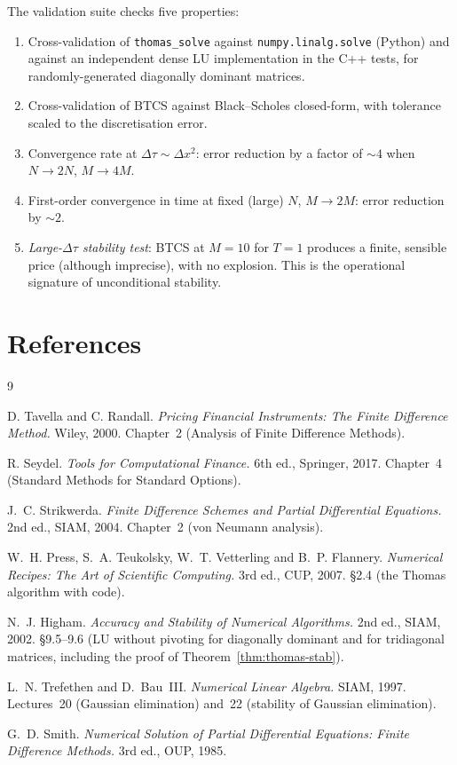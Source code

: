 \documentclass[11pt,a4paper]{article}
\begin{document}
The validation suite checks five properties:
\begin{enumerate}[leftmargin=2em]
\item Cross-validation of \texttt{thomas\_solve} against
\texttt{numpy.linalg.solve} (Python) and against an independent dense
LU implementation in the C++ tests, for randomly-generated diagonally
dominant matrices.
\item Cross-validation of BTCS against Black--Scholes closed-form,
with tolerance scaled to the discretisation error.
\item Convergence rate at $\Delta\tau \sim \Delta x^2$: error reduction
by a factor of $\sim 4$ when $N \to 2N$, $M \to 4M$.
\item First-order convergence in time at fixed (large) $N$, $M \to
2M$: error reduction by $\sim 2$.
\item \emph{Large-$\Delta\tau$ stability test}: BTCS at $M = 10$
for $T = 1$ produces a finite, sensible price (although imprecise),
with no explosion. This is the operational signature of unconditional
stability.
\end{enumerate}

\section*{References}

\begin{thebibliography}{9}

D. Tavella and C. Randall.
\emph{Pricing Financial Instruments: The Finite Difference Method.}
Wiley, 2000. Chapter~2 (Analysis of Finite Difference Methods).

R. Seydel.
\emph{Tools for Computational Finance.}
6th ed., Springer, 2017. Chapter~4 (Standard Methods for Standard
Options).

J.~C. Strikwerda.
\emph{Finite Difference Schemes and Partial Differential Equations.}
2nd ed., SIAM, 2004. Chapter~2 (von Neumann analysis).

W.~H. Press, S.~A. Teukolsky, W.~T. Vetterling and B.~P. Flannery.
\emph{Numerical Recipes: The Art of Scientific Computing.}
3rd ed., CUP, 2007. \S2.4 (the Thomas algorithm with code).

N.~J. Higham.
\emph{Accuracy and Stability of Numerical Algorithms.}
2nd ed., SIAM, 2002. \S9.5--9.6 (LU without pivoting for
diagonally dominant and for tridiagonal matrices, including the proof
of Theorem~\ref{thm:thomas-stab}).

L.~N. Trefethen and D.~Bau~III.
\emph{Numerical Linear Algebra.}
SIAM, 1997. Lectures~20 (Gaussian elimination) and~22 (stability of
Gaussian elimination).

G.~D. Smith.
\emph{Numerical Solution of Partial Differential Equations:
Finite Difference Methods.}
3rd ed., OUP, 1985.

\end{thebibliography}
\end{document}
